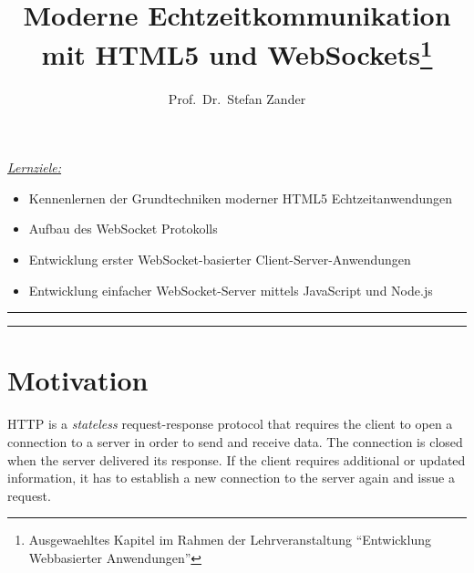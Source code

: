 \documentclass[a4paper, justified, notoc]{tufte-handout} %
\title{Moderne Echtzeitkommunikation mit HTML5 und WebSockets\thanks{Ausgewaehltes Kapitel im Rahmen der Lehrveranstaltung ``Entwicklung Webbasierter Anwendungen''}}
\author[opt Author]{Prof.\ Dr.\ Stefan Zander}
\newenvironment{lernziele}{
	\begin{mdframed}[hidealllines=true,backgroundcolor=gray!20] 
	\small \itshape
	\noindent \underline{Lernziele:} 
	} 
	{ 
	\end{mdframed}
}
\begin{document}
\maketitle%


\begin{lernziele}
\begin{itemize}
	\item Kennenlernen der Grundtechniken moderner HTML5 Echtzeitanwendungen
	\item Aufbau des WebSocket Protokolls
	\item Entwicklung erster WebSocket-basierter Client-Server-Anwendungen
	\item Entwicklung einfacher WebSocket-Server mittels JavaScript und Node.js 
\end{itemize}
\end{lernziele}


\setcounter{secnumdepth}{2} %

\noindent \rule{1.54\textwidth}{0.4pt}
\tableofcontents
\noindent \rule{1.54\textwidth}{0.4pt}

\section{Motivation}\label{sec:page-layout}
HTTP is a \emph{stateless} request-response protocol that requires the client to open a connection to a server in order to send and receive data. The connection is closed when the server delivered its response. If the client requires additional or updated information, it has to establish a new connection to the server again and issue a request. 
\end{document}
